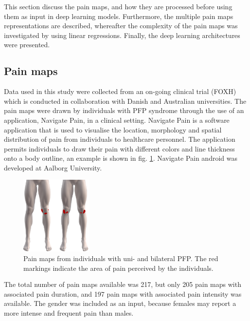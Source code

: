 This section discuss the pain maps, and how they are processed before using them as input in deep learning models. Furthermore, the multiple pain maps representations are described, whereafter the complexity of the pain maps was investigated by using linear regressions. Finally, the deep learning architectures were presented.

\subsection*{\textbf{Pain maps}}
Data used in this study were collected from an on-going clinical trial (FOXH) which is conducted in collaboration with Danish and Australian universities. The pain maps were drawn by individuals with PFP syndrome through the use of an application, Navigate Pain, in a clinical setting. \newline
\noindent
Navigate Pain is a software application that is used to visualise the location, morphology and spatial distribution of pain from individuals to healthcare personnel. The application permits individuals to draw their pain with different colors and line thickness onto a body outline, an example is shown in fig. \ref{fig:twoPainmaps}. Navigate Pain android was developed at Aalborg University.\citep{Solutions2015}

\begin{figure}[H]
\centering
\includegraphics[width=0.32\textwidth]{Figures/twoPainmaps}
\caption{Pain maps from individuals with uni- and bilateral PFP. The red markings indicate the area of pain perceived by the individuals.}
\label{fig:twoPainmaps}
\end{figure}

\noindent
The total number of pain maps available was 217, but only 205 pain maps with associated pain duration, and 197 pain maps with associated pain intensity was available. The gender was included as an input, because females may report a more intense and frequent pain than males. 


